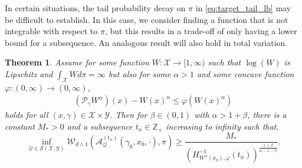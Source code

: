 \documentclass[12pt]{article}
\theoremstyle{plain}
\newtheorem{theorem}{Theorem}
\theoremstyle{remark}
\newcommand{\Z}{\mathbb{Z}}
\newcommand{\Q}{\mathcal{Q}}
\renewcommand{\P}{\mathcal{P}}
\newcommand{\W}{\mathcal{W}}
\newcommand{\A}{\mathcal{A}}
\newcommand{\X}{\mathcal{X}}
\newcommand{\Y}{\mathcal{Y}}
\renewcommand{\S}{\mathcal{S}}
\let\temp\phi
\let\phi\varphi
\let\varphi\temp
\begin{document}
In certain situations, the tail probability decay on $\pi$ in \eqref{eq:target_tail_lb} may be difficult to establish. 
In this case, we consider finding a function that is not integrable with respect to $\pi$, but this results in a trade-off of only having a lower bound for a subsequence.
An analogous result will also hold in total variation.

\begin{theorem}
\label{theorem:weak_lb}
Assume for some function $W : \X \to [1, \infty)$ such that $\log(W)$ is Lipschitz and $\int_\X W d\pi = \infty$ but also for some $\alpha > 1$ and some concave function $\phi : (0, \infty) \to (0, \infty)$,
\begin{align}
(\P_\gamma W^{\alpha})(x) - W(x)^\alpha  \le \phi( W(x)^\alpha )
\end{align}
holds for all $(x, \gamma) \in \X \times \Y$. 
Then for $\beta \in (0, 1)$ with $\alpha > 1 + \beta$, there is a constant $M_* > 0$ and a subsequence $t_n \in \Z_+$ increasing to infinity such that,
\[
\inf_{\Q \in \S(\X, \Y) } 
\W_{d \wedge 1}\left(\A_{\Q}^{(t_n)}(\gamma_0, x_0, \cdot), \pi \right)
\ge \frac{M_*}{ \left( H_{W^\alpha(x_0), \phi}^{-1}(t_n) \right)^{ \frac{1 + \beta}{\alpha - 1 - \beta} } }.
\]
\end{theorem}
\end{document}
